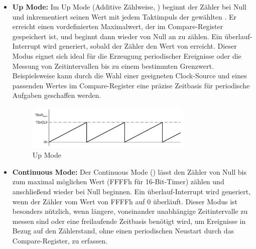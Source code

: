 \begin{itemize}
	\item \textbf{Up Mode:} Im Up Mode (Additive Z\"ahlweise, \Vgl {}) beginnt der Z\"ahler bei Null und inkrementiert seinen Wert mit jedem Taktimpuls der gew\"ahlten . Er erreicht einen vordefinierten Maximalwert, der im Compare-Register gespeichert ist, und beginnt dann wieder von Null an zu z\"ahlen. Ein \"uberlauf-Interrupt wird generiert, sobald der Z\"ahler den Wert von  erreicht. Dieser Modus eignet sich ideal f\"ur die Erzeugung periodischer Ereignisse oder die Messung von Zeitintervallen bis zu einem bestimmten Grenzwert. Beispielsweise kann durch die Wahl einer geeigneten Clock-Source und eines passenden Wertes im Compare-Register eine pr\"azise Zeitbasis f\"ur periodische Aufgaben geschaffen werden. 
	
	\vspace{1cm}
	\begin{figure}[h!]
		\centering
		\includegraphics[width=0.75\textwidth]{../Bilder/up_mode.png}
		\caption{Up Mode }
		\label{fig:up_mode}
	\end{figure}
	
	\newpage
	\item \textbf{Continuous Mode:} Der Continuous Mode (\Vgl {}) l\"asst den Z\"ahler von Null bis zum maximal m\"oglichen Wert (FFFFh f\"ur 16-Bit-Timer) z\"ahlen und anschlie{\ss}end wieder bei Null beginnen. Ein \"uberlauf-Interrupt wird generiert, wenn der Z\"ahler vom Wert von FFFFh auf 0 \"uberl\"auft.  Dieser Modus ist besonders n\"utzlich, wenn l\"angere, voneinander unabh\"angige Zeitintervalle zu messen sind oder eine freilaufende Zeitbasis ben\"otigt wird, um Ereignisse in Bezug auf den Z\"ahlerstand, ohne einen periodischen Neustart durch das Compare-Register, zu erfassen. 
	

\end{itemize}
